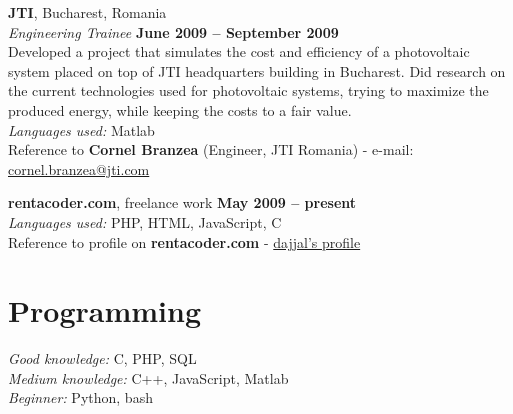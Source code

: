 \documentclass[margin,line]{resume}
\begin{document}
\begin{resume}
    \vspace{1.5mm}\textbf {JTI}, Bucharest, Romania \vspace{1.5mm}\\
	\vspace{1mm} \textsl {Engineering Trainee} \hfill \textbf{June 2009 -- September 2009}\vspace{1.5mm}\\\vspace{0mm}%
    Developed a project that simulates the cost and efficiency of a photovoltaic system placed 
	on top of JTI headquarters building in Bucharest. Did research on the current technologies used for photovoltaic systems, 
	trying to maximize the produced energy, while keeping the costs to a fair value. \vspace{1.5mm}\\
	\textit{Languages used:} Matlab \vspace{1.5mm}\\
	\small{Reference to \textbf{Cornel Branzea} (Engineer, JTI Romania) - e-mail: \href{mailto:cornel.branzea@jti.com}{cornel.branzea@jti.com} }

    \vspace{1.5mm}\textbf {rentacoder.com}, freelance work \hfill \textbf{May 2009 -- present}\vspace{1.5mm}\\\vspace{0mm}%
	\textit{Languages used:} PHP, HTML, JavaScript, C \vspace{1.5mm}\\
	\small{Reference to profile on \textbf{rentacoder.com} - 
		\href{http://www.vworker.com/RentACoder/DotNet/SoftwareCoders/ShowBioInfo.aspx?lngAuthorId=7028410}{dajjal's profile} }

    \section{\mysidestyle Programming} 
    \textit{Good knowledge:} C, PHP, SQL\\
	\textit{Medium knowledge:} C++, JavaScript, Matlab\\
	\textit{Beginner:} Python, bash

    

\end{resume}
\end{document}

